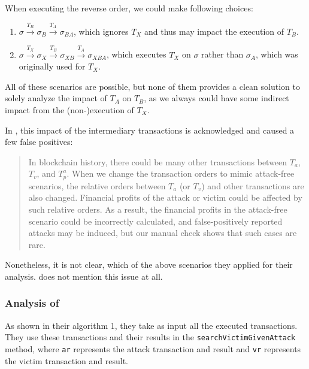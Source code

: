 \documentclass[draft,final]{vutinfth} %
\begin{document}
When executing the reverse order, we could make following choices:

\begin{enumerate}
    \item $\sigma \xrightarrow{T_B} \sigma_B \xrightarrow{T_A} \sigma_{BA}$, which ignores $T_X$ and thus may impact the execution of $T_B$.
    \item $\sigma \xrightarrow{T_X} \sigma_X \xrightarrow{T_B} \sigma_{XB} \xrightarrow{T_A} \sigma_{XBA}$, which executes $T_X$  on $\sigma$ rather than $\sigma_A$, which was originally used for $T_X$.
\end{enumerate}


All of these scenarios are possible, but none of them provides a clean solution to solely analyze the impact of $T_A$ on $T_B$, as we always could have some indirect impact from the (non-)execution of $T_X$.

In \cite{zhang_combatting_2023}, this impact of the intermediary transactions is acknowledged and caused a few false positives:

\begin{quote}
    In blockchain history, there could be many other transactions between $T_a$, $T_v$, and $T_p^a$. When we change the transaction orders to mimic attack-free scenarios, the relative orders between $T_a$ (or $T_v$) and other transactions are also changed. Financial profits of the attack or victim could be affected by such relative orders. As a result, the financial profits in the attack-free scenario could be incorrectly calculated, and false-positively reported attacks may be induced, but our manual check shows that such cases are rare.
\end{quote}

Nonetheless, it is not clear, which of the above scenarios they applied for their analysis. \cite{torres_frontrunner_2021} does not mention this issue at all.


\subsubsection{Analysis of \cite{zhang_combatting_2023}}


As shown in their algorithm 1, they take as input all the executed transactions. They use these transactions and their results in the \verb|searchVictimGivenAttack| method, where \verb|ar| represents the attack transaction and result and \verb|vr| represents the victim transaction and result.
\end{document}

